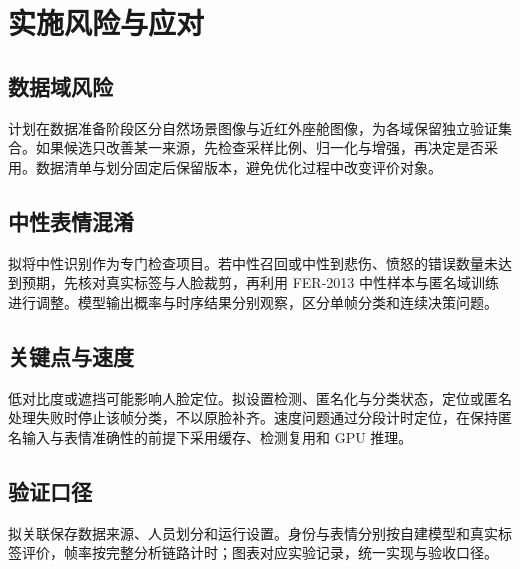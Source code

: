 \section{实施风险与应对}
\label{sec:discussion}
\subsection{数据域风险}
计划在数据准备阶段区分自然场景图像与近红外座舱图像，为各域保留独立验证集合。如果候选只改善某一来源，先检查采样比例、归一化与增强，再决定是否采用。数据清单与划分固定后保留版本，避免优化过程中改变评价对象。

\subsection{中性表情混淆}
拟将中性识别作为专门检查项目。若中性召回或中性到悲伤、愤怒的错误数量未达到预期，先核对真实标签与人脸裁剪，再利用 FER-2013 中性样本与匿名域训练进行调整。模型输出概率与时序结果分别观察，区分单帧分类和连续决策问题。

\subsection{关键点与速度}
低对比度或遮挡可能影响人脸定位。拟设置检测、匿名化与分类状态，定位或匿名处理失败时停止该帧分类，不以原脸补齐。速度问题通过分段计时定位，在保持匿名输入与表情准确性的前提下采用缓存、检测复用和 GPU 推理。

\subsection{验证口径}
拟关联保存数据来源、人员划分和运行设置。身份与表情分别按自建模型和真实标签评价，帧率按完整分析链路计时；图表对应实验记录，统一实现与验收口径。
